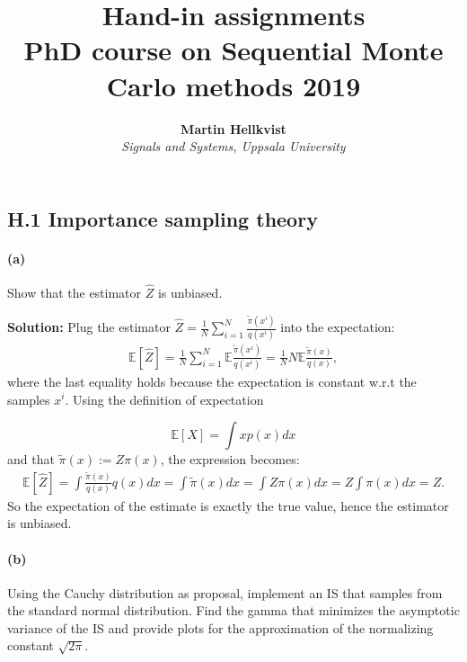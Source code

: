 \documentclass{article}
\title{Hand-in assignments \\ PhD course on Sequential Monte Carlo methods 2019}
\author{\textbf{Martin Hellkvist}\\
	 \textit{Signals and Systems, Uppsala University}}
\begin{document}
\maketitle
\subsection*{H.1 Importance sampling theory}
\paragraph{(a)} Show that the estimator $\hat{Z}$ is unbiased.

\textbf{Solution:} Plug the estimator $\hat{Z}=\frac{1}{N}\sum_{i=1}^N \frac{\tilde{\pi}(x^i)}{q(x^i)}$ into the expectation:
\begin{align}
	\mathbb{E}[\hat{Z}] = \frac{1}{N}\sum_{i=1}^{N}\mathbb{E}\frac{\tilde{\pi}(x^i)}{q(x^i)} = \frac{1}{N}N\mathbb{E}\frac{\tilde{\pi}(x)}{q(x)}, 
\end{align}
where the last equality holds because the expectation is constant w.r.t the samples $x^i$. Using the definition of expectation

	\begin{equation}
	\mathbb{E}[X]=\int x p(x)dx
	\end{equation}
\noindent and that $\tilde{\pi}(x):= Z\pi(x)$, the expression becomes:
	\begin{align}
		\mathbb{E}[\hat{Z}]= \int \frac{\tilde{\pi}(x)}{q(x)}q(x)dx = \int \tilde{\pi}(x)dx = \int Z \pi(x) dx= Z\int\pi(x)dx = Z.
	\end{align}
So the expectation of the estimate is exactly the true value, hence the estimator is unbiased.

\paragraph{(b)}
Using the Cauchy distribution as proposal, implement an IS that samples from the standard normal distribution. Find the gamma that minimizes the asymptotic variance of the IS and provide plots for the approximation of the normalizing constant $\sqrt{2\pi}$.
\end{document}
